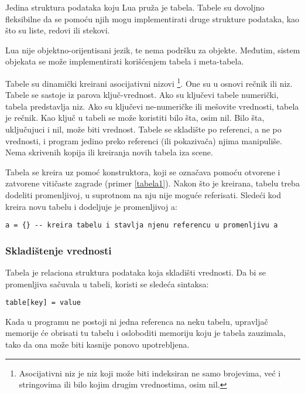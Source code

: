 \documentclass[a4paper]{article}
\begin{document}
Jedina struktura podataka koju Lua pruža je tabela. Tabele su dovoljno fleksibilne da se pomoću njih mogu implementirati druge strukture podataka, kao što su liste, redovi ili stekovi.

Lua nije objektno-orijentisani jezik, te nema podršku za objekte. Međutim, sistem objekata se može implementirati korišćenjem tabela i meta-tabela.

Tabele su dinamički kreirani asocijativni nizovi \footnote{Asocijativni niz je niz koji može biti indeksiran ne samo brojevima, već i stringovima ili bilo kojim drugim vrednostima, osim nil.}. One su u osnovi rečnik ili niz. Tabele se sastoje iz parova ključ-vrednost. Ako su ključevi tabele numerički, tabela predstavlja niz. Ako su ključevi ne-numeričke ili mešovite vrednosti, tabela je rečnik. Kao ključ u tabeli se može koristiti bilo šta, osim nil. Bilo šta, uključujuci i nil, može biti vrednost.
Tabele se skladište po referenci, a ne po vrednosti, i program jedino preko referenci (ili pokazivača) njima manipuliše. Nema skrivenih kopija ili kreiranja novih tabela iza scene.

Tabela se kreira uz pomoć konstruktora, koji se označava pomoću otvorene i zatvorene vitičaste zagrade (primer \ref{tabela1}). Nakon što je kreirana, tabelu treba dodeliti promenljivoj, u suprotnom na nju nije moguće referisati. Sledeći kod kreira novu tabelu i dodeljuje je promenljivoj a:
\begin{lstlisting}[caption={Funkcije},frame=single, label=fun1]
a = {} -- kreira tabelu i stavlja njenu referencu u promenljivu a
\end{lstlisting}


\subsubsection*{Skladištenje vrednosti}
Tabela je relaciona struktura podataka koja skladišti vrednosti. Da bi se promenljiva sačuvala u tabeli, koristi se sledeća sintaksa:
\begin{lstlisting}[caption={Čuvanje vrednosti \textit{value} u tabeli \cite{bookProgInLua}},frame=single, label=tabela1]
table[key] = value
\end{lstlisting}
Kada u programu ne postoji ni jedna referenca na neku tabelu, upravljač memorije će obrisati tu tabelu i osloboditi memoriju koju je tabela zauzimala, tako da ona može biti kasnije ponovo upotrebljena.
\end{document}
